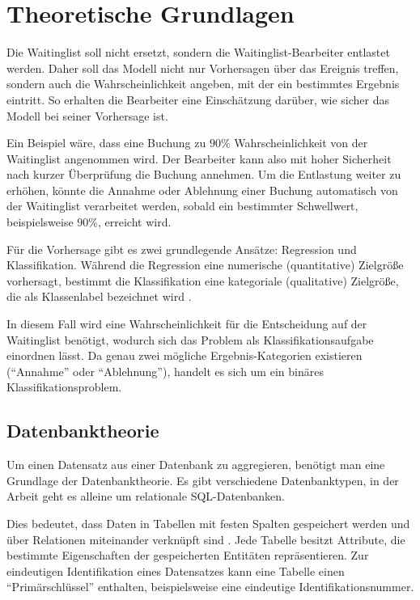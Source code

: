 \chapter{Theoretische Grundlagen}
\label{sec:t_grund}
Die Waitinglist soll nicht ersetzt, sondern die Waitinglist-Bearbeiter entlastet werden.  
Daher soll das Modell nicht nur Vorhersagen über das Ereignis treffen, sondern auch die Wahrscheinlichkeit angeben, mit der ein bestimmtes Ergebnis eintritt.  
So erhalten die Bearbeiter eine Einschätzung darüber, wie sicher das Modell bei seiner Vorhersage ist.

Ein Beispiel wäre, dass eine Buchung zu $90\%$ Wahrscheinlichkeit von der Waitinglist angenommen wird. 
Der Bearbeiter kann also mit hoher Sicherheit nach kurzer Überprüfung die Buchung annehmen.
Um die Entlastung weiter zu erhöhen, könnte die Annahme oder Ablehnung einer Buchung automatisch von der Waitinglist verarbeitet werden, sobald ein bestimmter Schwellwert, beispielsweise $90\%$, erreicht wird.

Für die Vorhersage gibt es zwei grundlegende Ansätze: Regression und Klassifikation.  
Während die Regression eine numerische (quantitative) Zielgröße vorhersagt, bestimmt die Klassifikation eine kategoriale (qualitative) Zielgröße, die als Klassenlabel bezeichnet wird \parencite[95]{vonderHude2020}.

In diesem Fall wird eine Wahrscheinlichkeit für die Entscheidung auf der Waitinglist benötigt, wodurch sich das Problem als Klassifikationsaufgabe einordnen lässt.  
Da genau zwei mögliche Ergebnis-Kategorien existieren (\enquote{Annahme} oder \enquote{Ablehnung}), handelt es sich um ein binäres Klassifikationsproblem.

\section{Datenbanktheorie}
Um einen Datensatz aus einer Datenbank zu aggregieren, benötigt man eine Grundlage der Datenbanktheorie.
Es gibt verschiedene Datenbanktypen, in der Arbeit geht es alleine um relationale SQL-Datenbanken.

Dies bedeutet, dass Daten in Tabellen mit festen Spalten gespeichert werden und über Relationen miteinander verknüpft sind \cite{Elmasri2015}. Jede Tabelle besitzt Attribute, die bestimmte Eigenschaften der gespeicherten Entitäten repräsentieren. Zur eindeutigen Identifikation eines Datensatzes kann eine Tabelle einen \enquote{Primärschlüssel} enthalten, beispielsweise eine eindeutige Identifikationsnummer.  


